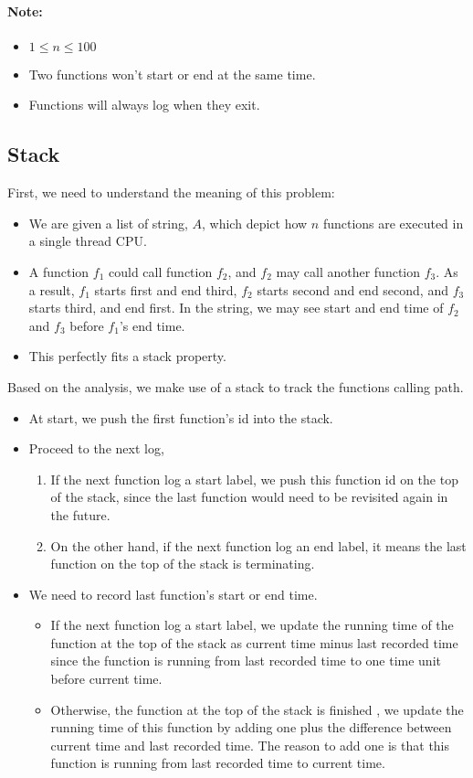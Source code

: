 \paragraph{Note:}

\begin{itemize}
\item $1 \leq n \leq 100$
\item Two functions won't start or end at the same time.
\item Functions will always log when they exit.
\end{itemize}

\subsection{Stack}
First, we need to understand the meaning of this problem:

\begin{itemize}
\item We are given a list of string, $A$, which depict how $n$ functions are executed in a single thread CPU.
\item A function $f_1$ could call function $f_2$, and $f_2$ may call another function $f_3$. As a result, $f_1$ starts first and end third, $f_2$ starts second and end second, and $f_3$ starts third, and end first. In the string, we may see start and end time of $f_2$ and $f_3$ before $f_1$'s end time.
\item This perfectly fits a stack property.
\end{itemize}

Based on the analysis, we make use of a stack to track the functions calling path.
\begin{itemize}
\item At start, we push the first function's id into the stack.
\item Proceed to the next log,
\begin{enumerate}
\item If the next function log a start label, we push this function id on the top of the stack, since the last function would need to be revisited again in the future. 
\item On the other hand, if the next function log an end label, it means the last function on the top of the stack is terminating.
\end{enumerate}
\item We need to record last function's start or end time.
\begin{itemize}
\item If the next function log a start label, we update the running time of the function at the top of the stack as current time minus last recorded time since the function is running from last recorded time to one time unit before current time.
\item Otherwise, the function at the top of the stack is finished , we update the running time of this function by adding one plus the difference between current time and last recorded time. The reason to add one is that this function is running from last recorded time to current time.
\end{itemize}
\end{itemize}